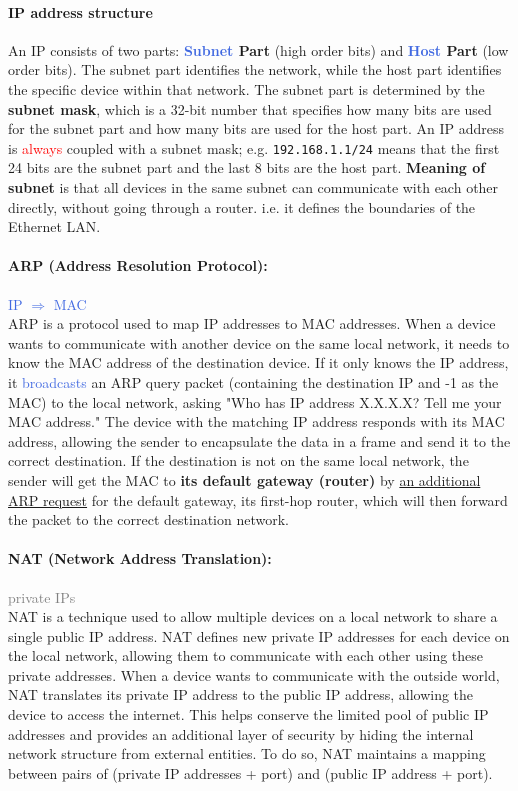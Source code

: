 \documentclass[openany,12pt]{book}
\newcommand{\code}[1]{\texttt{#1}}
\newcommand{\red}[1]{\textcolor{Red}{#1}}
\newcommand{\blue}[1]{\textcolor{RoyalBlue}{#1}}
\newcommand{\gray}[1]{\textcolor{gray}{#1}}
\begin{document}
\paragraph{IP address structure} An IP consists of two parts: \textbf{\blue{Subnet} Part} (high order bits) and \textbf{\blue{Host} Part} (low order bits). The subnet part identifies the network, while the host part identifies the specific device within that network. The subnet part is determined by the \textbf{subnet mask}, which is a 32-bit number that specifies how many bits are used for the subnet part and how many bits are used for the host part. An IP address is \red{always} coupled with a subnet mask; e.g. \code{192.168.1.1/24} means that the first 24 bits are the subnet part and the last 8 bits are the host part. \textbf{Meaning of subnet} is that all devices in the same subnet can communicate with each other directly, without going through a router. i.e. it defines the boundaries of the Ethernet LAN.


\paragraph{ARP (Address Resolution Protocol):} \blue{IP \(\Longrightarrow\) MAC} \\
ARP is a protocol used to map IP addresses to MAC addresses. When a device wants to communicate with another device on the same local network, it needs to know the MAC address of the destination device. If it only knows the IP address, it \blue{broadcasts} an ARP query packet (containing the destination IP and -1 as the MAC) to the local network, asking "Who has IP address X.X.X.X? Tell me your MAC address." The device with the matching IP address responds with its MAC address, allowing the sender to encapsulate the data in a frame and send it to the correct destination. If the destination is not on the same local network, the sender will get the MAC to \textbf{its default gateway (router)} by \ul{an additional ARP request} for the default gateway, its first-hop router, which will then forward the packet to the correct destination network.

\paragraph{NAT (Network Address Translation):} \gray{private IPs} \\
NAT is a technique used to allow multiple devices on a local network to share a single public IP address. NAT defines new private IP addresses for each device on the local network, allowing them to communicate with each other using these private addresses. When a device wants to communicate with the outside world, NAT translates its private IP address to the public IP address, allowing the device to access the internet. This helps conserve the limited pool of public IP addresses and provides an additional layer of security by hiding the internal network structure from external entities. To do so, NAT maintains a mapping between pairs of (private IP addresses + port) and (public IP address + port).
\end{document}
